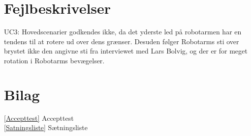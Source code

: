 \chapter{Fejlbeskrivelser} 
UC3: Hovedscenarier godkendes ikke, da det yderste led på robotarmen har en tendens til at rotere ud over dens grænser. Desuden følger Robotarms sti over brystet ikke den angivne sti fra interviewet med Lars Bolvig, og der er for meget rotation i Robotarms bevægelser. 

\backmatter 
\chapter{Bilag} 

\ref{Accepttest} Accepttest \\
\ref{Satningsliste} Sætningsliste

